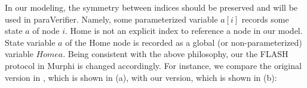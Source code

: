 \documentclass{llncs-new}
\begin{document}
In our modeling, the symmetry between indices should be preserved and will be used in {\sf paraVerifier}. Namely,  %
some parameterized variable $a[i]$ records some state  $a$ of node $i$. Home is not an explicit index to reference a node in our model. State variable
  $a$ of the Home node  is recorded as a global  (or non-parameterized) variable $Homea$. %
 Being consistent with the above philosophy, our the FLASH protocol in Murphi is changed accordingly. For instance, we compare the original version in \cite{Chou2004}, which is shown in (a), with our version, which is shown in (b):
\end{document}
